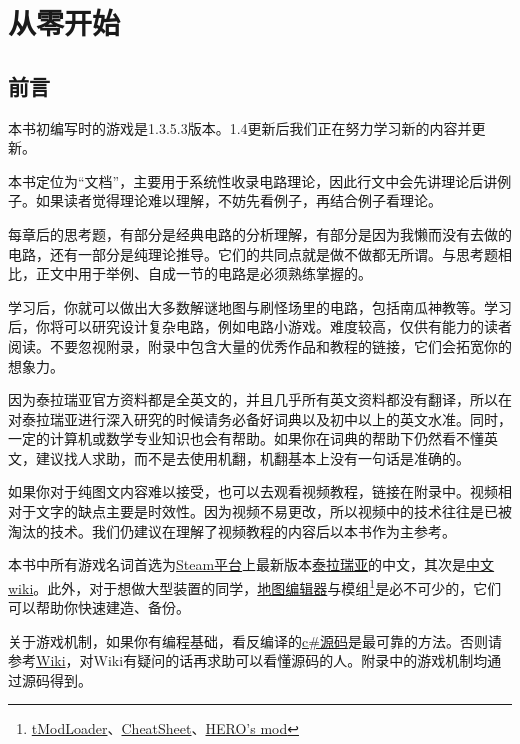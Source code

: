 \chapter{从零开始}

\section{前言}\label{sec1:1}
\begin{note}{}{}
本书初编写时的游戏是1.3.5.3版本。1.4更新后我们正在努力学习新的内容并更新。
\end{note}

本书定位为“文档”，主要用于系统性收录电路理论，因此行文中会先讲理论后讲例子。如果读者觉得理论难以理解，不妨先看例子，再结合例子看理论。

每章后的思考题，有部分是经典电路的分析理解，有部分是因为我懒而没有去做的电路，还有一部分是纯理论推导。它们的共同点就是做不做都无所谓。与思考题相比，正文中用于举例、自成一节的电路是必须熟练掌握的。

学习后，你就可以做出大多数解谜地图与刷怪场里的电路，包括南瓜神教等。学习后，你将可以研究设计复杂电路，例如电路小游戏。难度较高，仅供有能力的读者阅读。不要忽视附录，附录中包含大量的优秀作品和教程的链接，它们会拓宽你的想象力。

因为泰拉瑞亚官方资料都是全英文的，并且几乎所有英文资料都没有翻译，所以在对泰拉瑞亚进行深入研究的时候请务必备好词典以及初中以上的英文水准。同时，一定的计算机或数学专业知识也会有帮助。如果你在词典的帮助下仍然看不懂英文，建议找人求助，而不是去使用机翻，机翻基本上没有一句话是准确的。

如果你对于纯图文内容难以接受，也可以去观看视频教程，链接在附录中。视频相对于文字的缺点主要是时效性。因为视频不易更改，所以视频中的技术往往是已被淘汰的技术。我们仍建议在理解了视频教程的内容后以本书作为主参考。

本书中所有游戏名词首选为\href{https://store.steampowered.com/}{Steam平台}上最新版本\href{https://store.steampowered.com/app/105600/Terraria/}{泰拉瑞亚}的中文，其次是\href{https://terraria-zh.gamepedia.com/index.php?title=Terraria_Wiki&variant=zh}{中文wiki}。此外，对于想做大型装置的同学，\hyperref[app3]{地图编辑器}与模组\footnote{\hyperref[app4]{tModLoader}、\hyperref[app5]{CheatSheet}、\hyperref[app6]{HERO's mod}}是必不可少的，它们可以帮助你快速建造、备份。

关于游戏机制，如果你有编程基础，看反编译的\hyperref[app8]{c\#源码}是最可靠的方法。否则请参考\hyperref[app2]{Wiki}，对Wiki有疑问的话再求助可以看懂源码的人。附录中的游戏机制均通过源码得到。

